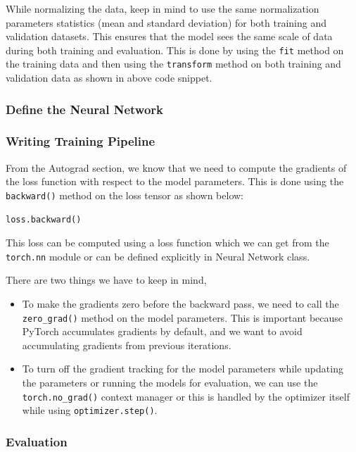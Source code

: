 \documentclass[12pt, a4paper]{article}
\begin{document}
While normalizing the data, keep in mind to use the same normalization parameters statistics (mean and standard deviation) for both training and validation datasets. This ensures that the model sees the same scale of data during both training and evaluation. This is done by using the \texttt{fit} method on the training data and then using the \texttt{transform} method on both training and validation data as shown in above code snippet.

\subsubsection{Define the Neural Network}

\subsubsection{Writing Training Pipeline}

From the Autograd section, we know that we need to compute the gradients of the loss function with respect to the model parameters. This is done using the \texttt{backward()} method on the loss tensor as shown below:

\begin{verbatim}
loss.backward()
\end{verbatim}

This loss can be computed using a loss function which we can get from the \texttt{torch.nn} module or can be defined explicitly in Neural Network class. 

There are two things we have to keep in mind, 

\begin{itemize}
    \item To make the gradients zero before the backward pass, we need to call the \texttt{zero\_grad()} method on the model parameters. This is important because PyTorch accumulates gradients by default, and we want to avoid accumulating gradients from previous iterations.
    \item To turn off the gradient tracking for the model parameters while updating the parameters or running the models for evaluation, we can use the \texttt{torch.no\_grad()} context manager or this is handled by the optimizer itself while using \texttt{optimizer.step()}.
\end{itemize}

\subsubsection{Evaluation}
\end{document}

